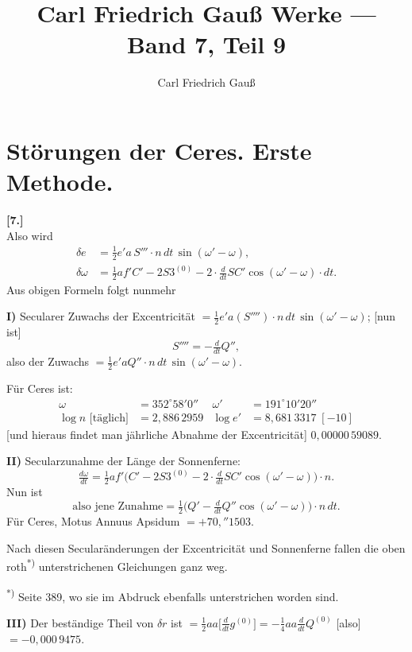 \documentclass[12pt,a4paper]{article}
\title{Carl Friedrich Gauß Werke --- Band 7, Teil 9}
\author{Carl Friedrich Gauß}
\date{}
\begin{document}
\maketitle
\thispagestyle{fancy}

\section*{Störungen der Ceres. Erste Methode.}

\setcounter{page}{401}
\noindent\textbf{[7.]}\\[0.5em]
%
Also wird
\begin{align*}
\delta e &= \tfrac{1}{2} e' a \, S''' \cdot n \, dt \, \sin(\omega' - \omega),\\
\delta \omega &= \tfrac{1}{2} a f' C' - 2S3^{(0)} - 2 \cdot \tfrac{d}{dt} SC' \cos(\omega' - \omega) \cdot dt.
\end{align*}
%
Aus obigen Formeln folgt nunmehr

\medskip\noindent
\textbf{I)} Secularer Zuwachs der Excentricität $= \tfrac{1}{2} e' a (S'''') \cdot n \, dt \, \sin(\omega' - \omega)$; [nun ist]
\[S'''' = -\tfrac{d}{dt} Q'',\]
also der Zuwachs $= \tfrac{1}{2} e' a Q'' \cdot n \, dt \, \sin(\omega' - \omega)$.

Für Ceres ist: 
\begin{align*}
\omega &= 352^\circ 58' 0'' & \omega' &= 191^\circ 10' 20''\\
\log n \text{ [täglich]} &= 2{,}886\,2959 & \log e' &= 8{,}681\,3317 \;[-10]
\end{align*}
[und hieraus findet man jährliche Abnahme der Excentricität] $0{,}00000\,59089$.

\medskip\noindent
\textbf{II)} Secularzunahme der Länge der Sonnenferne:
\[\tfrac{d\omega}{dt} = \tfrac{1}{2} a f' \bigl(C' - 2S3^{(0)} - 2 \cdot \tfrac{d}{dt} SC' \cos(\omega' - \omega)\bigr) \cdot n.\]
Nun ist
\[\text{also jene Zunahme} = \tfrac{1}{2}\bigl(Q' - \tfrac{d}{dt} Q'' \cos(\omega' - \omega)\bigr) \cdot n \, dt.\]
Für Ceres, Motus Annuus Apsidum $= +70{,}''1503$.

Nach diesen Secularänderungen der Excentricität und Sonnenferne fallen die oben roth\textsuperscript{*)} unterstrichenen Gleichungen ganz weg.

\smallskip\noindent\textsuperscript{*)} Seite 389, wo sie im Abdruck ebenfalls unterstrichen worden sind.

\medskip\noindent
\textbf{III)} Der beständige Theil von $\delta r$ ist $= \tfrac{1}{2} aa\bigl[\tfrac{d}{dt} g^{(0)}\bigr] = -\tfrac{1}{4} aa \tfrac{d}{dt} Q^{(0)}$ [also] $= -0{,}000\,9475$.
\end{document}
